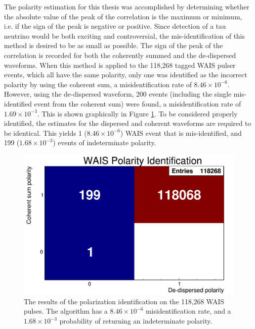 	The polarity estimation for this thesis was accomplished by determining whether the absolute value of the peak of the correlation is the maximum or minimum, i.e. if the sign of the peak is negative or positive.  Since detection of a tau neutrino would be both exciting and controversial, the mis-identification of this method is desired to be as small as possible.  The sign of the peak of the correlation is recorded for both the coherently summed and the de-dispersed waveforms.  When this method is applied to the 118,268 tagged WAIS pulser events, which all have the same polarity, only one was identified as the incorrect polarity by using the coherent sum, a misidentification rate of $8.46\times10^{-6}$.  However, using the de-dispersed waveform, 200 events (including the single mis-identified event from the coherent sum) were found, a misidentification rate of $1.69\times10^{-3}$.  This is shown graphically in Figure \ref{fig:waisPolarity}.  To be considered properly identified, the estimates for the dispersed and coherent waveforms are required to be identical.  This yields 1 ($8.46\times10^{-6}$) WAIS event that is mis-identified, and 199 ($1.68\times10^{-3}$) events of indeterminate polarity.
	
		
\begin{figure}
	\centering
	\includegraphics[width=\textwidth]{figures/waisPolarity}
	\caption{The results of the polarization identification on the 118,268 WAIS pulses.  The algorithm has a $8.46\times10^{-6}$ misidentification rate, and a $1.68\times10^{-3}$ probability of returning an indeterminate polarity.} 
	\label{fig:waisPolarity}
\end{figure}
	

